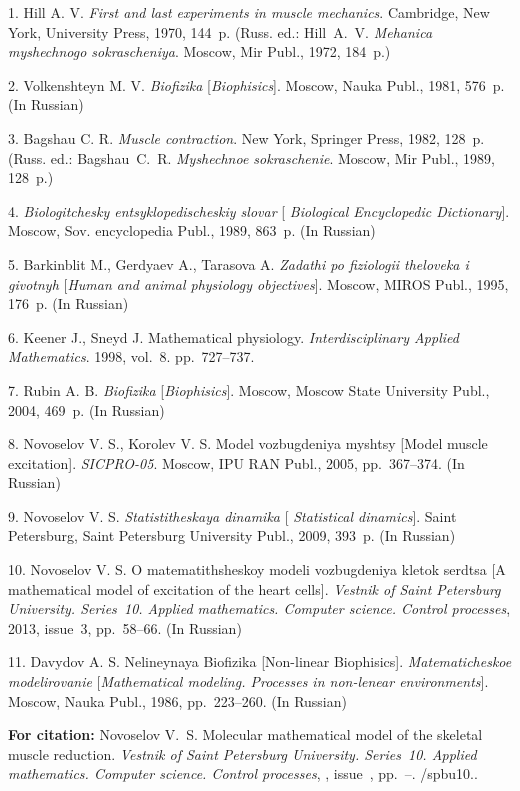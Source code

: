 


{\footnotesize

\vskip 3mm


\vskip 2mm

1. Hill A. V.  {\it First and last experiments in muscle
mechanics}. Cambridge, New York,  University Press, 1970, 144~p.
(Russ. ed.: Hill~A.~V. {\it Mehanica myshechnogo sokrascheniya}.
Moscow, Mir Publ., 1972, 184~p.)

2. Volkenshteyn M. V.  {\it Biofizika} [{\it Biophisics}]. Moscow,
Nauka Publ., 1981, 576~p.     (In Russian)

3. Bagshau C. R. {\it Muscle contraction}. New York,  Springer
Press, 1982, 128~p. (Russ. ed.: Bagshau~C.~R. {\it Myshechnoe
sokraschenie}. Moscow, Mir Publ., 1989, 128~p.)


4. {\it Biologitchesky entsyklopedischeskiy slovar} [{\it
Biological Encyclopedic Dictionary}]. Moscow, Sov. encyclopedia
Publ., 1989, 863~p. (In Russian)


5. Barkinblit M., Gerdyaev A., Tarasova A.  {\it Zadathi po
fiziologii theloveka i givotnyh} [{\it Human and animal physiology
objectives}]. Moscow,  MIROS Publ., 1995, 176~p.      (In Russian)


6.  Keener J., Sneyd J. Mathematical physiology. {\it
Interdisciplinary Applied Mathematics}. 1998, vol.~8.
pp.~727--737.



7. Rubin A. B. {\it Biofizika} [{\it Biophisics}]. Moscow, Moscow
State University Publ., 2004, 469~p. (In Russian)

8. Novoselov V. S., Korolev V. S. Model vozbugdeniya myshtsy
[Model muscle excitation]. {\it SICPRO-05}. Moscow, IPU RAN Publ.,
2005, pp.~367--374. (In Russian)

9. Novoselov V. S. {\it Statistitheskaya dinamika} [{\it
Statistical dinamics}]. Saint Petersburg, Saint Petersburg
University  Publ., 2009, 393~p. (In Russian)

10. Novoselov V. S.  O matematithsheskoy modeli vozbugdeniya
kletok serdtsa [A mathematical model of excitation of the heart
cells]. {\it Vestnik of  Saint Petersburg University.  Series~10.
Applied mathematics. Computer science. Control processes}, 2013,
issue~3, pp.~58--66. (In Russian)

11. Davydov A. S.  Nelineynaya Biofizika [Non-linear Biophisics].
{\it Matematicheskoe modelirovanie} [{\it Mathematical modeling.
Processes in non-lenear environments}]. Moscow, Nauka Publ., 1986,
pp.~223--260. (In Russian)



\vskip 1mm

{\bf For citation:} Novoselov V.~S. Molecular mathematical model
of the skeletal muscle reduction. {\it Vestnik of Saint Petersburg
University. Series~10. Applied mathematics. Computer science.
Control processes}, \issueyear, issue~\issuenum,
pp.~\pageref{p8}--\pageref{p8e}.
\doivyp/spbu10.\issueyear.


}
